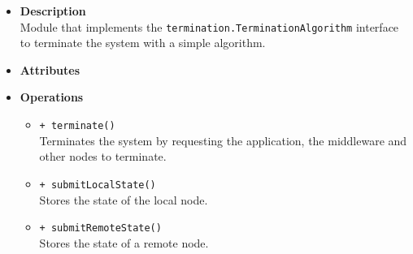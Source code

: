 \FloatBarrier
\begin{itemize}
  \item \textbf{Description} \\
    Module that implements the \texttt{termination.TerminationAlgorithm}
    interface to terminate the system with a simple algorithm.
  \item \textbf{Attributes}
  \item \textbf{Operations}
  \begin{itemize}
    \item \texttt{+ terminate()} \\
    Terminates the system by requesting the application, the middleware and
    other nodes to terminate.
    \item \texttt{+ submitLocalState()} \\
    Stores the state of the local node.
    \item \texttt{+ submitRemoteState()} \\
    Stores the state of a remote node.
  \end{itemize}
\end{itemize}
